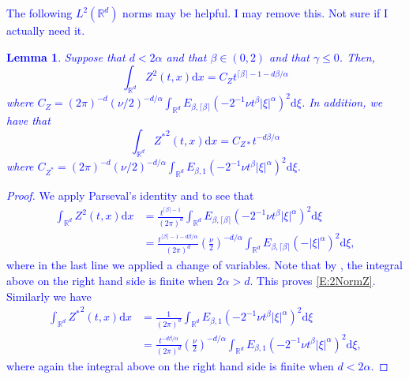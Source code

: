 \documentclass[a4paper,11pt]{article}
\numberwithin{equation}{section}
\theoremstyle{plain}
\newtheorem{lemma}[theorem]{Lemma}
\theoremstyle{definition}
\newcommand{\ud}{\ensuremath{\mathrm{d} }}
\newcommand{\R}{\mathbb{R}}
\numberwithin{NQ}{section}
\numberwithin{LQ}{section}
\numberwithin{ZQ}{section}
\begin{document}
	
	\textcolor{blue}{
		The following $L^2(\R^d)$ norms may be helpful. I may remove this. Not sure if I actually need it.
		\begin{lemma}
			\label{L:2NormZandZ*}
			Suppose that $d < 2 \alpha$ and that $\beta \in (0,2)$ and that $\gamma \le 0$. Then,
			\begin{equation}
			\label{E:2NormZ}
			\int_{\R^d} Z^2(t,x) \ud x = C_{Z} t^{\lceil \beta \rceil -1 - d\beta / \alpha}
			\end{equation}		
			where $C_{Z} = (2\pi)^{-d}(\nu/2)^{-d/\alpha}\int_{\R^d} E_{\beta,\lceil \beta \rceil}\left( -2^{-1}\nu t^\beta |\xi|^\alpha \right)^2 \ud \xi$. In addition, we have that
			\begin{equation}
			\label{E:2NormZ*}
			\int_{\R^d} {Z^*}^2(t,x) \ud x = C_{Z*} t^{-d\beta / \alpha}
			\end{equation}		
			where $C_{Z^*} = (2\pi)^{-d} (\nu/2)^{-d/\alpha} \int_{\R^d} E_{\beta,1}\left( -2^{-1}\nu t^\beta |\xi|^\alpha \right)^2 \ud \xi$.
		\end{lemma}
		\begin{proof}
			We apply Parseval's identity and \cite[Theorem 4.1]{CHN19} to see that 
			\begin{align*}
			\int_{\R^d} Z^2(t,x) \ud x &= \frac{t^{\lceil \beta \rceil -1}}{(2\pi)^d} \int_{\R^d} E_{\beta,\lceil \beta \rceil}\left( -2^{-1}\nu t^\beta |\xi|^\alpha \right)^2 \ud \xi \\
			&= \frac{t^{\lceil \beta \rceil -1 - d\beta / \alpha}}{(2\pi)^d} \left( \frac{\nu}{2} \right)^{-d/\alpha} \int_{\R^d} E_{\beta,\lceil \beta \rceil}\left( -|\xi|^\alpha \right)^2 \ud \xi,
			\end{align*}
			where in the last line we applied a change of variables. Note that by \cite[Theorem 1.6]{Podlubny99}, the integral above on the right hand side is finite when $2\alpha >d$. This proves \eqref{E:2NormZ}. Similarly we have 
			\begin{align*}
			\int_{\R^d} {Z^*}^2(t,x) \ud x &= \frac{1}{(2\pi)^d} \int_{\R^d} E_{\beta,1}\left( -2^{-1}\nu t^\beta |\xi|^\alpha \right)^2 \ud \xi \\
			&= \frac{t^{-d\beta /\alpha}}{(2\pi)^d} \left(\frac{\nu}{2}\right)^{-d/\alpha} \int_{\R^d} E_{\beta,1}\left( -2^{-1}\nu t^\beta |\xi|^\alpha \right)^2 \ud \xi,
			\end{align*}
			where again the integral above on the right hand side is finite when $d < 2\alpha$.
		\end{proof}
	}
	
\end{document}
